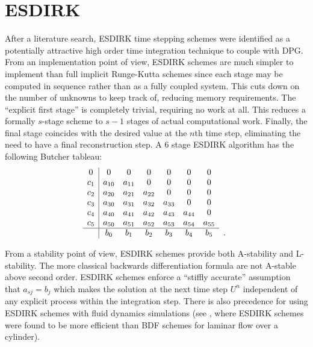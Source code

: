 \documentclass[Proposal.tex]{subfiles}
\begin{document}
\section{ESDIRK}
After a literature search, ESDIRK time stepping schemes were identified as a potentially attractive high order time integration technique to couple with DPG.
From an implementation point of view, ESDIRK schemes are much simpler to implement than full implicit Runge-Kutta schemes since each stage may be computed in sequence rather than as a fully coupled system. 
This cuts down on the number of unknowns to keep track of, reducing memory requirements.
The ``explicit first stage'' is completely trivial, requiring no work at all. 
This reduces a formally $s$-stage scheme to $s-1$ stages of actual computational work.
Finally, the final stage coincides with the desired value at the $n$th time step, eliminating the need to have a final reconstruction step.
A 6 stage ESDIRK algorithm has the following Butcher tableau:
\[
\begin{array}{c|cccccc}
  0 & 0 & 0 & 0 & 0 & 0 & 0 \\
  c_1 & a_{10} & a_{11} & 0 & 0 & 0 & 0 \\
  c_2 & a_{20} & a_{21} & a_{22} & 0 & 0 & 0 \\
  c_3 & a_{30} & a_{31} & a_{32} & a_{33} & 0 & 0 \\
  c_4 & a_{40} & a_{41} & a_{42} & a_{43} & a_{44} & 0 \\
  c_5 & a_{50} & a_{51} & a_{52} & a_{53} & a_{54} & a_{55} \\
  \hline
   & b_0 & b_1 & b_2 & b_3 & b_4 & b_5 \\
\end{array}
\begin{array}{c}
  \vphantom{} \\
  \vphantom{} \\
  \vphantom{} \\
  \vphantom{} \\
  \vphantom{} \\
  \vphantom{} \\
  . \\
\end{array}
\]

From a stability point of view, ESDIRK schemes provide both A-stability and L-stability. 
The more classical backwards differentiation formula are not A-stable above second order.
ESDIRK schemes enforce a ``stiffly accurate'' assumption that $a_{sj}=b_j$ which makes the solution at the next time step $U^n$ independent of any explicit process within the integration step.
There is also precedence for using ESDIRK schemes with fluid dynamics simulations (see \cite{Bijl2002}, where ESDIRK schemes were found to be more efficient than BDF schemes for laminar flow over a cylinder).
\end{document}

